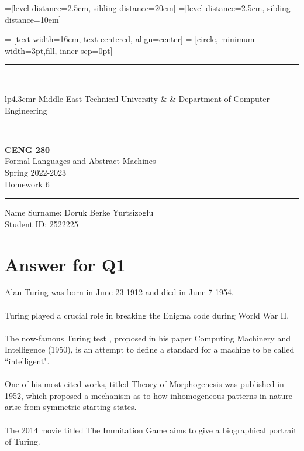 \documentclass[12pt]{article}
\newcommand{\HRule}{\rule{\linewidth}{1mm}}
\begin{document}
=[level distance=2.5cm, sibling distance=20em]
=[level distance=2.5cm, sibling distance=10em]

 = [text width=16em, text centered, align=center]
 = [circle, minimum width=3pt,fill, inner sep=0pt]

\noindent
\HRule \\[3mm]
\small
\begin{tabular}[b]{lp{4.3cm}r}
Middle East Technical University &  &
Department of Computer Engineering \\
\end{tabular} \\
\begin{center}

                 \LARGE \textbf{CENG 280} \\[4mm]
                 \Large Formal Languages and Abstract Machines \\[4mm]
                \normalsize Spring 2022-2023 \\
                    \Large Homework 6 \\
\end{center}
\HRule



\begin{center}
Name Surname: Doruk Berke Yurtsizoglu   \\
Student ID: 2522225
\end{center}



\section*{Answer for Q1}
   
Alan Turing was born in June 23 1912 and died in June 7 1954. \\
\\
Turing played a crucial role in breaking the Enigma code during World War II. \\
\\
The now-famous Turing test , proposed in his paper Computing Machinery and Intelligence (1950), is an attempt to define a standard for a machine to be called “intelligent". \\
\\
One of his most-cited works, titled Theory of Morphogenesis was published in 1952, which proposed a mechanism as to how inhomogeneous patterns in nature arise from symmetric starting states. \\
\\
The 2014 movie titled The Immitation Game aims to give a biographical portrait of Turing. \\
\end{document}
